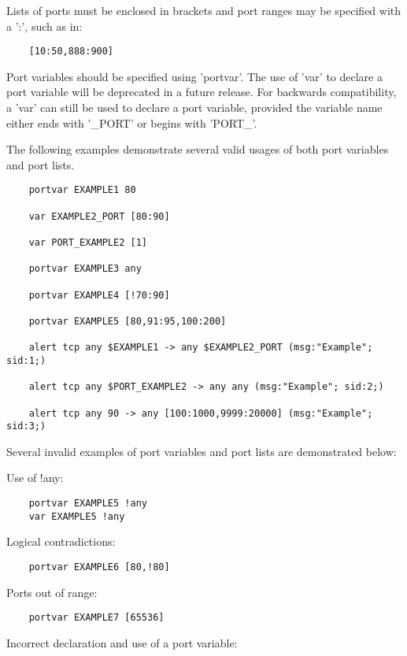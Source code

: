 \documentclass[english]{report}
\begin{document}
Lists of ports must be enclosed in brackets and port ranges may be specified
with a ':', such as in:

\begin{verbatim}     
    [10:50,888:900]
\end{verbatim}

Port variables should be specified using 'portvar'.  The use of 'var' to
declare a port variable will be deprecated in a future release.  For backwards
compatibility, a 'var' can still be used to declare a port variable, provided
the variable name either ends with '\_PORT' or begins with 'PORT\_'. 

The following examples demonstrate several valid usages of both port variables
and port lists.

\begin{verbatim}     
    portvar EXAMPLE1 80

    var EXAMPLE2_PORT [80:90]

    var PORT_EXAMPLE2 [1]

    portvar EXAMPLE3 any

    portvar EXAMPLE4 [!70:90]

    portvar EXAMPLE5 [80,91:95,100:200]

    alert tcp any $EXAMPLE1 -> any $EXAMPLE2_PORT (msg:"Example"; sid:1;)

    alert tcp any $PORT_EXAMPLE2 -> any any (msg:"Example"; sid:2;)

    alert tcp any 90 -> any [100:1000,9999:20000] (msg:"Example"; sid:3;)
\end{verbatim}

Several invalid examples of port variables and port lists are demonstrated
below:

Use of !any:

\begin{verbatim}     
    portvar EXAMPLE5 !any
    var EXAMPLE5 !any
\end{verbatim}

Logical contradictions:

\begin{verbatim}     
    portvar EXAMPLE6 [80,!80]
\end{verbatim}

Ports out of range:

\begin{verbatim}     
    portvar EXAMPLE7 [65536]
\end{verbatim}

Incorrect declaration and use of a port variable:
\end{document}

